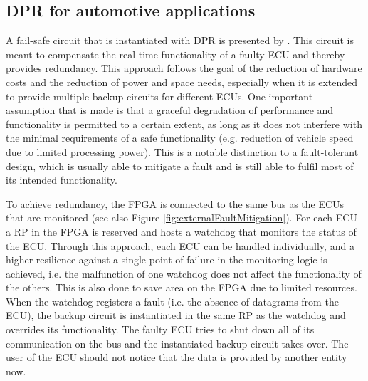 \subsection{\gls{DPR} for automotive applications}
A fail-safe circuit that is instantiated with \gls{DPR} is presented by \cite{crdl_fail-safe_2002}. 
This circuit is meant to compensate the real-time functionality of a faulty \gls{ECU} and thereby provides redundancy.
This approach follows the goal of the reduction of hardware costs and the reduction of power and space needs, especially when it is extended to provide multiple backup circuits for different \glspl{ECU}.
One important assumption that is made is that a graceful degradation of performance and functionality is permitted to a certain extent, as long as it does not interfere with the minimal requirements of a safe functionality (e.g. reduction of vehicle speed due to limited processing power).
This is a notable distinction to a fault-tolerant design, which is usually able to mitigate a fault and is still able to fulfil most of its intended functionality.

To achieve redundancy, the \gls{FPGA} is connected to the same bus as the \glspl{ECU} that are monitored (see also Figure \ref{fig:externalFaultMitigation}).
For each \gls{ECU} a \gls{RP} in the \gls{FPGA} is reserved and hosts a watchdog that monitors the status of the \gls{ECU}.
Through this approach, each \gls{ECU} can be handled individually, and a higher resilience against a single point of failure in the monitoring logic is achieved, i.e. the malfunction of one watchdog does not affect the functionality of the others.
This is also done to save area on the \gls{FPGA} due to limited resources.
When the watchdog registers a fault (i.e. the absence of datagrams from the \gls{ECU}), the backup circuit is instantiated in the same \gls{RP} as the watchdog and overrides its functionality.
The faulty \gls{ECU} tries to shut down all of its communication on the bus and the instantiated backup circuit takes over.
The user of the \gls{ECU} should not notice that the data is provided by another entity now.

